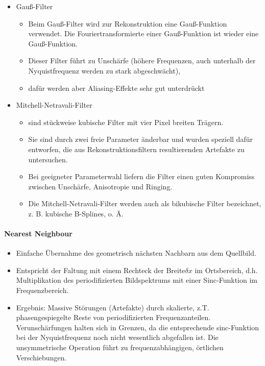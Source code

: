 \documentclass[10pt,landscape]{article}
\begin{document}
\begin{multicols}{3}
\begin{itemize}
  \item Gauß-Filter
        \begin{itemize}
          \item Beim Gauß-Filter wird zur Rekonstruktion eine Gauß-Funktion verwendet. Die Fouriertransformierte einer Gauß-Funktion ist wieder eine Gauß-Funktion.
          \item Dieser Filter führt zu Unschärfe (höhere Frequenzen, auch unterhalb der Nyquistfrequenz werden zu stark abgeschwächt),
          \item dafür werden aber Aliasing-Effekte sehr gut unterdrückt
        \end{itemize}
        
  \item Mitchell-Netravali-Filter
        \begin{itemize}
          \item sind stückweise kubische Filter mit vier Pixel breiten Trägern.
          \item Sie sind durch zwei freie Parameter änderbar und wurden speziell dafür entworfen, die aus Rekonstruktionsfiltern resultierenden Artefakte zu untersuchen.
          \item Bei geeigneter Parameterwahl liefern die Filter einen guten Kompromiss zwischen Unschärfe, Anisotropie und Ringing.
          \item Die Mitchell-Netravali-Filter werden auch als bikubische Filter bezeichnet, z. B. kubische B-Splines, o. Ä.
        \end{itemize}
\end{itemize}

\paragraph{Nearest Neighbour}
\begin{itemize}
  \item Einfache Übernahme des geometrisch nächsten Nachbarn aus dem Quellbild.
  \item Entspricht der Faltung mit einem Rechteck der Breite$\delta x$ im Ortsbereich, d.h. Multiplikation des periodifizierten Bildspektrums mit einer Sinc-Funktion im Frequenzbereich.
  \item Ergebnis: Massive Störungen (Artefakte) durch skalierte, z.T. phasengespiegelte Reste von periodifizierten Frequenzanteilen. Verunschärfungen halten sich in Grenzen, da die entsprechende sinc-Funktion bei der Nyquistfrequenz noch nicht wesentlich abgefallen ist. Die unsymmetrische Operation führt zu frequenzabhängigen, örtlichen Verschiebungen.
\end{itemize}


\end{multicols}
\end{document}
